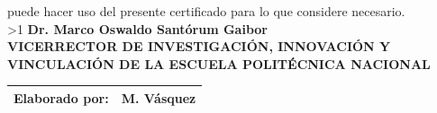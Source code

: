\documentclass[fleqn,10pt]{wlscirep}
\begin{document}


\noindent \ifnum{}\fi \docente\hspace{0.3em}puede hacer uso del presente certificado para lo que considere necesario.
 \\
\vfill
\ifnum\firmante>1{
\noindent \textbf{Dr. Marco Oswaldo Santórum Gaibor} \\
\textbf{VICERRECTOR DE INVESTIGACIÓN, INNOVACIÓN Y VINCULACIÓN DE LA ESCUELA POLITÉCNICA NACIONAL}
}\fi
\noindent
\begin{table}[ht]
\begin{tabular}{|l|l|}
\hline
\small Elaborado por: & M. Vásquez\\
\hline
\end{tabular}
\end{table}
\end{document}
